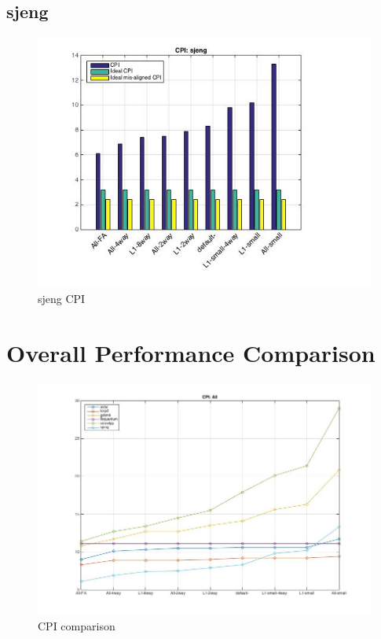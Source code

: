 \documentclass[11pt,titlepage]{article}
\begin{document}
    \subsection{sjeng}
        \begin{figure}[H]
            \centering
            \includegraphics[scale=0.75]{CPIsjeng}
            \caption{sjeng CPI}
            \label{fig:CPIsjeng}
        \end{figure}

\section{Overall Performance Comparison}

\begin{figure}[H]
            \centering
            \includegraphics[scale=0.5]{CPIall}
            \caption{CPI comparison}
            \label{fig:CPIall}
        \end{figure}
        
\end{document}
